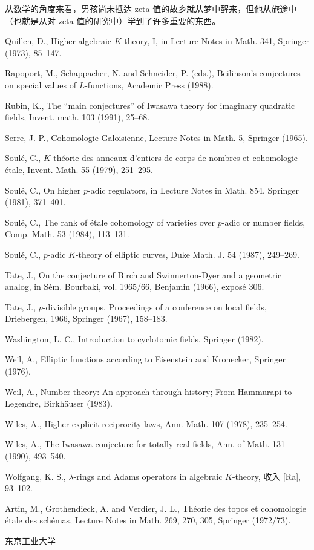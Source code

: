 \begin{description}[style=nextline,leftmargin=3.7em,labelwidth=3.2em,font=\normalfont\small,itemsep=.6em]
从数学的角度来看，男孩尚未抵达 zeta 值的故乡就从梦中醒来，但他从旅途中
（也就是从对 zeta 值的研究中）学到了许多重要的东西。
\item[{[Qu]}] Quillen, D., Higher algebraic $K$-theory, I, in Lecture Notes in Math. 341, Springer (1973), 85--147.
\item[{[Ra]}] Rapoport, M., Schappacher, N. and Schneider, P. (eds.), Beilinson's conjectures on special values of $L$-functions, Academic Press (1988).
\item[{[Ru]}] Rubin, K., The ``main conjectures'' of Iwasawa theory for imaginary quadratic fields, Invent. math. 103 (1991), 25--68.
\item[{[Se]}] Serre, J.-P., Cohomologie Galoisienne, Lecture Notes in Math. 5, Springer (1965).
\item[{[So1]}] Soulé, C., $K$-théorie des anneaux d'entiers de corps de nombres et cohomologie étale, Invent. Math. 55 (1979), 251--295.
\item[{[So2]}] Soulé, C., On higher $p$-adic regulators, in Lecture Notes in Math. 854, Springer (1981), 371--401.
\item[{[So3]}] Soulé, C., The rank of étale cohomology of varieties over $p$-adic or number fields, Comp. Math. 53 (1984), 113--131.
\item[{[So4]}] Soulé, C., $p$-adic $K$-theory of elliptic curves, Duke Math. J. 54 (1987), 249--269.
\item[{[Ta1]}] Tate, J., On the conjecture of Birch and Swinnerton-Dyer and a geometric analog, in Sém. Bourbaki, vol. 1965/66, Benjamin (1966), exposé 306.
\item[{[Ta2]}] Tate, J., $p$-divisible groups, Proceedings of a conference on local fields, Driebergen, 1966, Springer (1967), 158--183.
\item[{[Wa]}] Washington, L. C., Introduction to cyclotomic fields, Springer (1982).
\item[{[We1]}] Weil, A., Elliptic functions according to Eisenstein and Kronecker, Springer (1976).
\item[{[We2]}] Weil, A., Number theory: An approach through history; From Hammurapi to Legendre, Birkhäuser (1983).
\item[{[Wi1]}] Wiles, A., Higher explicit reciprocity laws, Ann. Math. 107 (1978), 235--254.
\item[{[Wi2]}] Wiles, A., The Iwasawa conjecture for totally real fields, Ann. of Math. 131 (1990), 493--540.
\item[{[Wo]}] Wolfgang, K. S., $\lambda$-rings and Adams operators in algebraic $K$-theory, 收入 [Ra], 93--102.
\item[{[SGA4]}] Artin, M., Grothendieck, A. and Verdier, J. L., Théorie des topos et cohomologie étale des schémas, Lecture Notes in Math. 269, 270, 305, Springer (1972/73).
\end{description}
\begin{flushright}东京工业大学\end{flushright}
